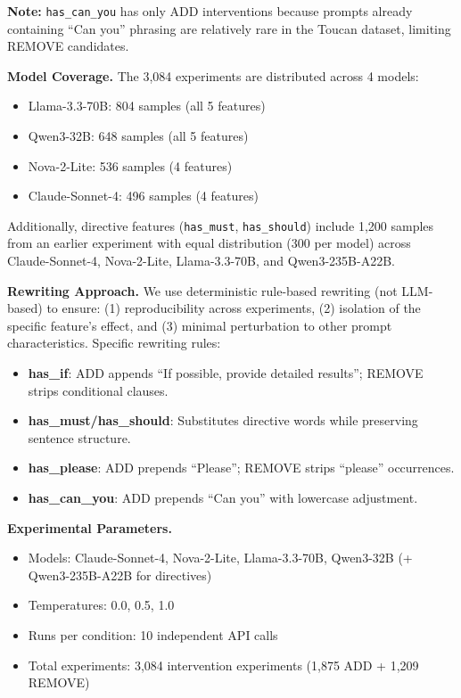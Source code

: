\documentclass[sigconf,anonymous,review]{acmart}
\begin{document}
\textbf{Note:} \texttt{has\_can\_you} has only ADD interventions because prompts already containing ``Can you'' phrasing are relatively rare in the Toucan dataset, limiting REMOVE candidates.

\textbf{Model Coverage.} The 3,084 experiments are distributed across 4 models:
\begin{itemize}
    \item Llama-3.3-70B: 804 samples (all 5 features)
    \item Qwen3-32B: 648 samples (all 5 features)
    \item Nova-2-Lite: 536 samples (4 features)
    \item Claude-Sonnet-4: 496 samples (4 features)
\end{itemize}
Additionally, directive features (\texttt{has\_must}, \texttt{has\_should}) include 1,200 samples from an earlier experiment with equal distribution (300 per model) across Claude-Sonnet-4, Nova-2-Lite, Llama-3.3-70B, and Qwen3-235B-A22B.

\textbf{Rewriting Approach.} We use deterministic rule-based rewriting (not LLM-based) to ensure: (1) reproducibility across experiments, (2) isolation of the specific feature's effect, and (3) minimal perturbation to other prompt characteristics. Specific rewriting rules:
\begin{itemize}
    \item \textbf{has\_if}: ADD appends ``If possible, provide detailed results''; REMOVE strips conditional clauses.
    \item \textbf{has\_must/has\_should}: Substitutes directive words while preserving sentence structure.
    \item \textbf{has\_please}: ADD prepends ``Please''; REMOVE strips ``please'' occurrences.
    \item \textbf{has\_can\_you}: ADD prepends ``Can you'' with lowercase adjustment.
\end{itemize}

\textbf{Experimental Parameters.}
\begin{itemize}
    \item Models: Claude-Sonnet-4, Nova-2-Lite, Llama-3.3-70B, Qwen3-32B (+ Qwen3-235B-A22B for directives)
    \item Temperatures: 0.0, 0.5, 1.0
    \item Runs per condition: 10 independent API calls
    \item Total experiments: 3,084 intervention experiments (1,875 ADD + 1,209 REMOVE)
\end{itemize}
\end{document}
